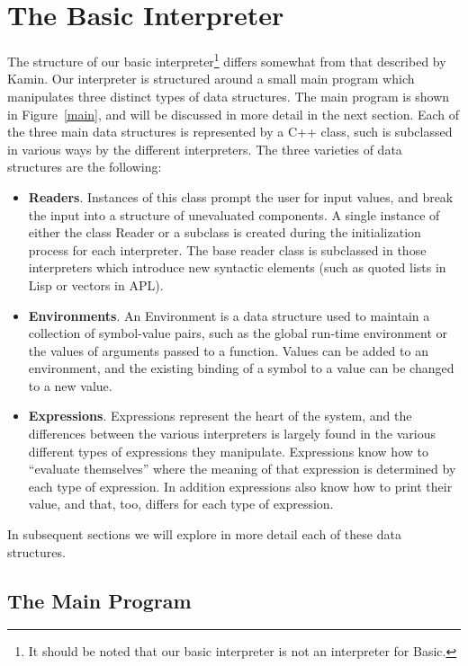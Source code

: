 \chapter{The Basic Interpreter}

The structure of our basic interpreter\footnote{It should be noted that our
    basic interpreter is not an interpreter for Basic.}  differs somewhat from
that described by Kamin.  Our interpreter is structured around a small main
program which manipulates three distinct types of data structures.  The main
program is shown in Figure~\ref{main}, and will be discussed in more detail in
the next section.  Each of the three main data structures is represented by a
C++ class, such is subclassed in various ways by the different interpreters.
The three varieties of data structures are the following:
%
\begin{itemize}
    \item {\bf Readers}.  Instances of this class prompt the user for input
    values, and break the input into a structure of unevaluated components.  A
    single instance of either the class {\sf Reader} or a subclass is created
    during the initialization process for each interpreter.  The base reader
    class is subclassed in those interpreters which introduce new syntactic
    elements (such as quoted lists in Lisp or vectors in APL).
    \item {\bf Environments}.  An Environment is a data structure used to
    maintain a collection of symbol-value pairs, such as the global run-time
    environment or the values of arguments passed to a function.  Values can be
    added to an environment, and the existing binding of a symbol to a value can
    be changed to a new value.
    \item {\bf Expressions}.  Expressions represent the heart of the system, and
    the differences between the various interpreters is largely found in the
    various different types of expressions they manipulate.  Expressions know
    how to ``evaluate themselves'' where the meaning of that expression is
    determined by each type of expression.  In addition expressions also know
    how to print their value, and that, too, differs for each type of
    expression.
\end{itemize}

In subsequent sections we will explore in more detail each of these data
structures.

\section{The Main Program}

